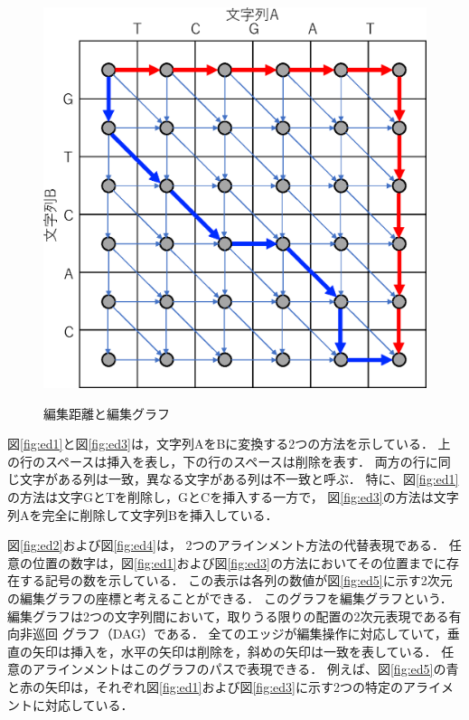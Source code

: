 \begin{figure}[ht!]
\begin{center}
{        \includegraphics[keepaspectratio, scale=0.65]{fig/2/ed5.eps}
        \label{fig:ed5}
      }
    \caption{編集距離と編集グラフ}
    \label{fig:ed}
    \end{center}
  \end{figure}
図\ref{fig:ed1}と図\ref{fig:ed3}は，文字列AをBに変換する2つの方法を示している．
上の行のスペースは挿入を表し，下の行のスペースは削除を表す．
両方の行に同じ文字がある列は一致，異なる文字がある列は不一致と呼ぶ．
特に、図\ref{fig:ed1}の方法は文字GとTを削除し，GとCを挿入する一方で，
図\ref{fig:ed3}の方法は文字列Aを完全に削除して文字列Bを挿入している．

図\ref{fig:ed2}および図\ref{fig:ed4}は， 2つのアラインメント方法の代替表現である．
任意の位置の数字は，図\ref{fig:ed1}および図\ref{fig:ed3}の方法においてその位置までに存
在する記号の数を示している．
この表示は各列の数値が図\ref{fig:ed5}に示す2次元の編集グラフの座標と考えることができる．
このグラフを編集グラフという．
編集グラフは2つの文字列間において，取りうる限りの配置の2次元表現である有向非巡回
グラフ（DAG）である．
全てのエッジが編集操作に対応していて，垂直の矢印は挿入を，水平の矢印は削除を，斜めの矢印は一致を表している．
任意のアラインメントはこのグラフのパスで表現できる．
例えば、図\ref{fig:ed5}の青と赤の矢印は，それぞれ図\ref{fig:ed1}および図\ref{fig:ed3}に示す2つの特定のアライメントに対応している．

